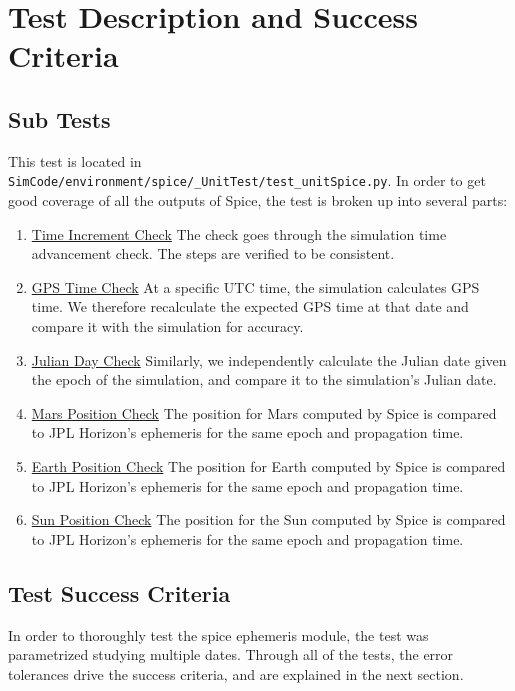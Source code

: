 \section{Test Description and Success Criteria}

\subsection{Sub Tests}

This test is located in {\tt SimCode/environment/spice/\_UnitTest/test\_unitSpice.py}. In order to get good coverage of all the outputs of Spice, the test is broken up into several parts: \par

\begin{enumerate}
\item \underline{Time Increment Check} The check goes through the simulation time advancement check. The steps are verified to be consistent. 
\item \underline{GPS Time Check} At a specific UTC time, the simulation calculates GPS time. We therefore recalculate the expected GPS time at that date and compare it with the simulation for accuracy. 
\item \underline{Julian Day Check} Similarly, we independently calculate the Julian date given the epoch of the simulation, and compare it to the simulation's Julian date.
\item \underline{Mars Position Check} The position for Mars computed by Spice is compared to JPL Horizon's ephemeris for the same epoch and propagation time.
\item \underline{Earth Position Check} The position for Earth computed by Spice is compared to JPL Horizon's ephemeris for the same epoch and propagation time.
\item \underline{Sun Position Check} The position for the Sun computed by Spice is compared to JPL Horizon's ephemeris for the same epoch and propagation time.
\end{enumerate} 

\subsection{Test Success Criteria}

In order to thoroughly test the spice ephemeris module, the test was parametrized studying multiple dates. Through all of the tests, the error tolerances drive the success criteria, and are explained in the next section. 

